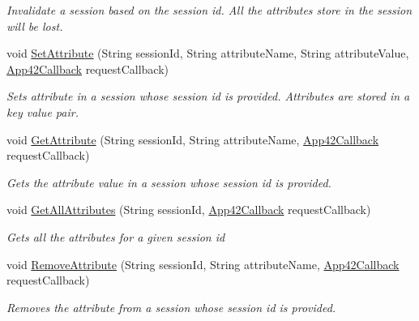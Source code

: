\begin{DoxyCompactItemize}
\begin{DoxyCompactList}\small\item\em Invalidate a session based on the session id. All the attributes store in the session will be lost. \end{DoxyCompactList}\item 
void \hyperlink{classcom_1_1shephertz_1_1app42_1_1paas_1_1sdk_1_1windows_1_1session_1_1_session_service_a8d156c0bb24b1e9240a91106b6f0e5ee}{Set\+Attribute} (String session\+Id, String attribute\+Name, String attribute\+Value, \hyperlink{interfacecom_1_1shephertz_1_1app42_1_1paas_1_1sdk_1_1windows_1_1_app42_callback}{App42\+Callback} request\+Callback)
\begin{DoxyCompactList}\small\item\em Sets attribute in a session whose session id is provided. Attributes are stored in a key value pair. \end{DoxyCompactList}\item 
void \hyperlink{classcom_1_1shephertz_1_1app42_1_1paas_1_1sdk_1_1windows_1_1session_1_1_session_service_a3deb2309c9fd4e0e7c2d3d2ff9738e80}{Get\+Attribute} (String session\+Id, String attribute\+Name, \hyperlink{interfacecom_1_1shephertz_1_1app42_1_1paas_1_1sdk_1_1windows_1_1_app42_callback}{App42\+Callback} request\+Callback)
\begin{DoxyCompactList}\small\item\em Gets the attribute value in a session whose session id is provided. \end{DoxyCompactList}\item 
void \hyperlink{classcom_1_1shephertz_1_1app42_1_1paas_1_1sdk_1_1windows_1_1session_1_1_session_service_a04d35f1404f5006e7bca378bf5d147fe}{Get\+All\+Attributes} (String session\+Id, \hyperlink{interfacecom_1_1shephertz_1_1app42_1_1paas_1_1sdk_1_1windows_1_1_app42_callback}{App42\+Callback} request\+Callback)
\begin{DoxyCompactList}\small\item\em Gets all the attributes for a given session id \end{DoxyCompactList}\item 
void \hyperlink{classcom_1_1shephertz_1_1app42_1_1paas_1_1sdk_1_1windows_1_1session_1_1_session_service_a671d88f46bc4806ffc9f3bf79b48cb0c}{Remove\+Attribute} (String session\+Id, String attribute\+Name, \hyperlink{interfacecom_1_1shephertz_1_1app42_1_1paas_1_1sdk_1_1windows_1_1_app42_callback}{App42\+Callback} request\+Callback)
\begin{DoxyCompactList}\small\item\em Removes the attribute from a session whose session id is provided. \end{DoxyCompactList}\item 

\end{DoxyCompactItemize}

